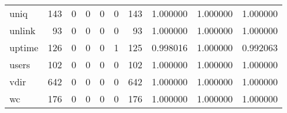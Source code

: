 \begin{longtable}{lrrrrrrrrr}
uniq      &                                                143 &                                                  0 &                                                  0 &                                                  0 &                                                  0 &                                                143 &                                           1.000000 &                               1.000000 &                             1.000000 \\
unlink    &                                                 93 &                                                  0 &                                                  0 &                                                  0 &                                                  0 &                                                 93 &                                           1.000000 &                               1.000000 &                             1.000000 \\
uptime    &                                                126 &                                                  0 &                                                  0 &                                                  0 &                                                  1 &                                                125 &                                           0.998016 &                               1.000000 &                             0.992063 \\
users     &                                                102 &                                                  0 &                                                  0 &                                                  0 &                                                  0 &                                                102 &                                           1.000000 &                               1.000000 &                             1.000000 \\
vdir      &                                                642 &                                                  0 &                                                  0 &                                                  0 &                                                  0 &                                                642 &                                           1.000000 &                               1.000000 &                             1.000000 \\
wc        &                                                176 &                                                  0 &                                                  0 &                                                  0 &                                                  0 &                                                176 &                                           1.000000 &                               1.000000 &                             1.000000 \\

\end{longtable}
